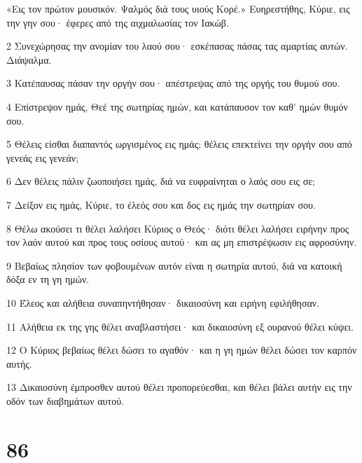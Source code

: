 \par «Εις τον πρώτον μουσικόν. Ψαλμός διά τους υιούς Κορέ.» Ευηρεστήθης, Κύριε, εις την γην σου· έφερες από της αιχμαλωσίας τον Ιακώβ.
\par 2 Συνεχώρησας την ανομίαν του λαού σου· εσκέπασας πάσας τας αμαρτίας αυτών. Διάψαλμα.
\par 3 Κατέπαυσας πάσαν την οργήν σου· απέστρεψας από της οργής του θυμού σου.
\par 4 Επίστρεψον ημάς, Θεέ της σωτηρίας ημών, και κατάπαυσον τον καθ' ημών θυμόν σου.
\par 5 Θέλεις είσθαι διαπαντός ωργισμένος εις ημάς; θέλεις επεκτείνει την οργήν σου από γενεάς εις γενεάν;
\par 6 Δεν θέλεις πάλιν ζωοποιήσει ημάς, διά να ευφραίνηται ο λαός σου εις σε;
\par 7 Δείξον εις ημάς, Κύριε, το έλεός σου και δος εις ημάς την σωτηρίαν σου.
\par 8 Θέλω ακούσει τι θέλει λαλήσει Κύριος ο Θεός· διότι θέλει λαλήσει ειρήνην προς τον λαόν αυτού και προς τους οσίους αυτού· και ας μη επιστρέψωσιν εις αφροσύνην.
\par 9 Βεβαίως πλησίον των φοβουμένων αυτόν είναι η σωτηρία αυτού, διά να κατοική δόξα εν τη γη ημών.
\par 10 Έλεος και αλήθεια συναπηντήθησαν· δικαιοσύνη και ειρήνη εφιλήθησαν.
\par 11 Αλήθεια εκ της γης θέλει αναβλαστήσει· και δικαιοσύνη εξ ουρανού θέλει κύψει.
\par 12 Ο Κύριος βεβαίως θέλει δώσει το αγαθόν· και η γη ημών θέλει δώσει τον καρπόν αυτής.
\par 13 Δικαιοσύνη έμπροσθεν αυτού θέλει προπορεύεσθαι, και θέλει βάλει αυτήν εις την οδόν των διαβημάτων αυτού.

\chapter{86}

